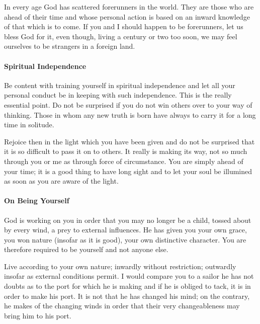 \begin{quotex}
In every age God has scattered forerunners in the world. They are those who are ahead of their time and whose personal action is based on an inward knowledge of that which is to come. If you and I should happen to be forerunners, let us bless God for it, even though, living a century or two too soon, we may feel ourselves to be strangers in a foreign land.
\end{quotex}


\paragraph{Spiritual Independence}


\begin{quotex}
Be content with training yourself in spiritual independence and let all your personal conduct be in keeping with such independence. This is the really essential point. Do not be surprised if you do not win others over to your way of thinking. Those in whom any new truth is born have always to carry it for a long time in solitude.

Rejoice then in the light which you have been given and do not be surprised that it is so difficult to pass it on to others. It really is making its way, not so much through you or me as through force of circumstance. You are simply ahead of your time; it is a good thing to have long sight and to let your soul be illumined as soon as you are aware of the light.
\end{quotex}


\paragraph{On Being Yourself}


\begin{quotex}
God is working on you in order that you may no longer be a child, tossed about by every wind, a prey to external influences. He has given you your own grace, you won nature (insofar as it is good), your own distinctive character. You are therefore required to be yourself and not anyone else.

Live according to your own nature; inwardly without restriction; outwardly insofar as external conditions permit. I would compare you to a sailor he has not doubts as to the port for which he is making and if he is obliged to tack, it is in order to make his port. It is not that he has changed his mind; on the contrary, he makes of the changing winds in order that their very changeableness may bring him to his port.
\end{quotex}


